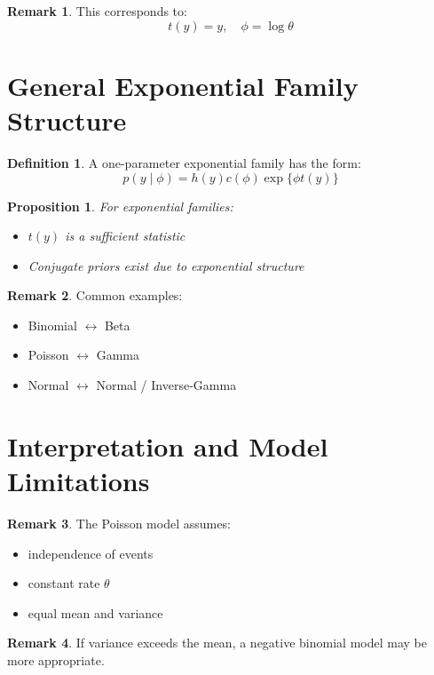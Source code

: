 \documentclass[12pt,oneside]{book}
\numberwithin{equation}{section}
\theoremstyle{definition}
\newtheorem{definition}{Definition}[section]
\newtheorem{remark}{Remark}[section]
\theoremstyle{plain}
\newtheorem{proposition}{Proposition}[section]
\theoremstyle{remark}
\begin{document}
\begin{remark}
This corresponds to:
$$
t(y) = y, \quad \phi = \log \theta
$$
\end{remark}

\section{General Exponential Family Structure}

\begin{definition}
A one-parameter exponential family has the form:
$$
p(y \mid \phi) = h(y)c(\phi)\exp\{\phi t(y)\}
$$
\end{definition}

\begin{proposition}
For exponential families:
\begin{itemize}
\item $t(y)$ is a sufficient statistic
\item Conjugate priors exist due to exponential structure
\end{itemize}
\end{proposition}

\begin{remark}
Common examples:
\begin{itemize}
\item Binomial $\leftrightarrow$ Beta
\item Poisson $\leftrightarrow$ Gamma
\item Normal $\leftrightarrow$ Normal / Inverse-Gamma
\end{itemize}
\end{remark}

\section{Interpretation and Model Limitations}

\begin{remark}
The Poisson model assumes:
\begin{itemize}
\item independence of events
\item constant rate $\theta$
\item equal mean and variance
\end{itemize}
\end{remark}

\begin{remark}
If variance exceeds the mean, a negative binomial model may be more appropriate.
\end{remark}
\end{document}
